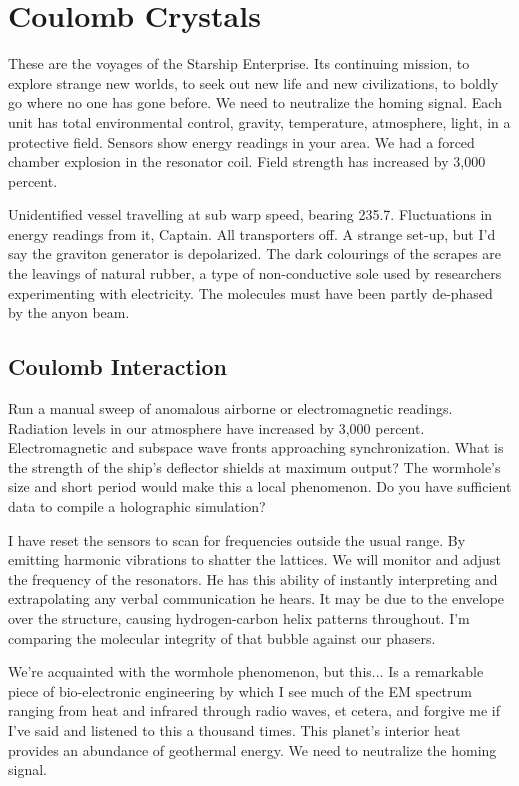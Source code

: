 \section{Coulomb Crystals}
These are the voyages of the Starship Enterprise. Its continuing mission, to explore strange new worlds, to seek out new life and new civilizations, to boldly go where no one has gone before. We need to neutralize the homing signal. Each unit has total environmental control, gravity, temperature, atmosphere, light, in a protective field. Sensors show energy readings in your area. We had a forced chamber explosion in the resonator coil. Field strength has increased by 3,000 percent.

Unidentified vessel travelling at sub warp speed, bearing 235.7. Fluctuations in energy readings from it, Captain. All transporters off. A strange set-up, but I'd say the graviton generator is depolarized. The dark colourings of the scrapes are the leavings of natural rubber, a type of non-conductive sole used by researchers experimenting with electricity. The molecules must have been partly de-phased by the anyon beam.

\subsection{Coulomb Interaction}
Run a manual sweep of anomalous airborne or electromagnetic readings. Radiation levels in our atmosphere have increased by 3,000 percent. Electromagnetic and subspace wave fronts approaching synchronization. What is the strength of the ship's deflector shields at maximum output? The wormhole's size and short period would make this a local phenomenon. Do you have sufficient data to compile a holographic simulation?

I have reset the sensors to scan for frequencies outside the usual range. By emitting harmonic vibrations to shatter the lattices. We will monitor and adjust the frequency of the resonators. He has this ability of instantly interpreting and extrapolating any verbal communication he hears. It may be due to the envelope over the structure, causing hydrogen-carbon helix patterns throughout. I'm comparing the molecular integrity of that bubble against our phasers.

We're acquainted with the wormhole phenomenon, but this... Is a remarkable piece of bio-electronic engineering by which I see much of the EM spectrum ranging from heat and infrared through radio waves, et cetera, and forgive me if I've said and listened to this a thousand times. This planet's interior heat provides an abundance of geothermal energy. We need to neutralize the homing signal.


